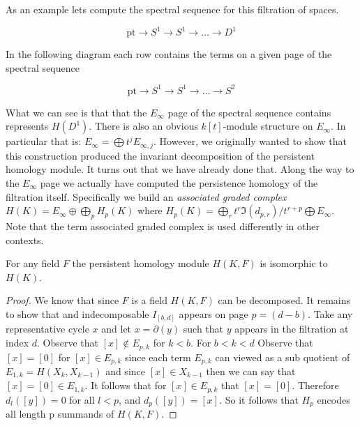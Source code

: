 As an example lets compute the spectral sequence for this filtration of spaces.
\begin{example}
\[ \textrm{pt} \rightarrow S^1 \rightarrow S^1 \rightarrow \ldots \rightarrow D^1 \] 
\end{example}
In the following diagram each row contains the terms on a given page of the spectral sequence
\begin{tikzcd}
\end{tikzcd}

\begin{example}
\[ \textrm{pt} \rightarrow S^1 \rightarrow S^1 \rightarrow \ldots \rightarrow S^2 \] 
\end{example}
\begin{tikzcd}
\end{tikzcd}
What we can see is that that the $E_\infty$ page of the spectral sequence contains represents $H(D^1)$. There is also an obvious $k[t]$-module structure on $E_\infty$. In particular that is: $E_\infty = \bigoplus t^j E_{\infty,j}$. However, we originally wanted to show that this construction produced the invariant decomposition of the persistent homology module. It turns out that we have already done that. Along the way to the $E_\infty$ page we actually have computed the persistence homology of the filtration itself. Specifically we build an \emph{associated graded complex} $H(K) = E_\infty \oplus \bigoplus_p H_p(K)$ where $H_p(K) = \bigoplus_r t^r \Im(d_{p,r}) / t^{r+p} \bigoplus E_\infty$. Note that the term associated graded complex is used differently in other contexts.
\begin{theorem}
For any field $F$ the persistent homology module $H(K,F)$ is isomorphic to $H(K)$.
\end{theorem}
\begin{proof}
We know that since $F$ is a field $H(K,F)$ can be decomposed. It remains to show that and indecomposable $I_{[b,d]}$ appears on page $p = (d-b)$. Take any representative cycle $x$ and let $x = \partial(y)$ such that $y$ appears in the filtration at index $d$. Observe that $[x] \notin E_{p,k}$ for $k < b$. For $b < k < d$ Observe that $[x]  = [0]$ for $[x] \in E_{p,k}$  since each term $E_{p,k}$ can viewed as a sub quotient of $E_{1,k} = H(X_k, X_{k-1})$ and since $[x] \in X_{k-1}$ then we can say that $[x] = [0] \in E_{1,k} $. It follows that for $[x] \in E_{p,k}$ that $[x] = [0]$. Therefore $d_l([y]) = 0$ for all $l < p$, and $d_p([y])=[x]$. So it follows that $H_p$ encodes all length p summands of $H(K,F)$.
\end{proof}
